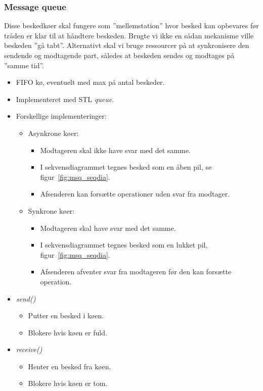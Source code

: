 \subsubsection{Message queue}
Disse beskedkøer skal fungere som ''mellemstation'' hvor besked kan opbevares før tråden er klar til at håndtere beskeden. Brugte vi ikke en sådan mekanisme ville beskeden ''gå tabt''. Alternativt skal vi bruge ressourcer på at synkronisere den sendende og modtagende part, således at beskeden sendes og modtages på ''samme tid''.


\begin{itemize}
	\item FIFO kø, eventuelt med max på antal beskeder.
	\item Implementeret med STL \textit{queue}.
	\item Forskellige implementeringer:
	\begin{itemize}
		\item Asynkrone køer:
		\begin{itemize}
			\item Modtageren skal ikke have svar med det samme.
			\item I sekvensdiagrammet tegnes besked som en åben pil, se figur~\ref{fig:msq_seqdia}.
			\item Afsenderen kan forsætte operationer uden svar fra modtager.
		\end{itemize}
		\item Synkrone køer:
		\begin{itemize}
			\item Modtageren skal have svar med det samme.
			\item I sekvensdiagrammet tegnes besked som en lukket pil, figur~\ref{fig:msq_seqdia}.
			\item Afsenderen afventer svar fra modtageren før den kan forsætte operation.
		\end{itemize}
	\end{itemize}
	\item \textit{send()}
	\begin{itemize}
		\item Putter en besked i køen.
		\item Blokere hvis køen er fuld.
	\end{itemize}
	\item \textit{receive()}
	\begin{itemize}
		\item Henter en besked fra køen.
		\item Blokere hvis køen er tom.
	\end{itemize}
\end{itemize}

